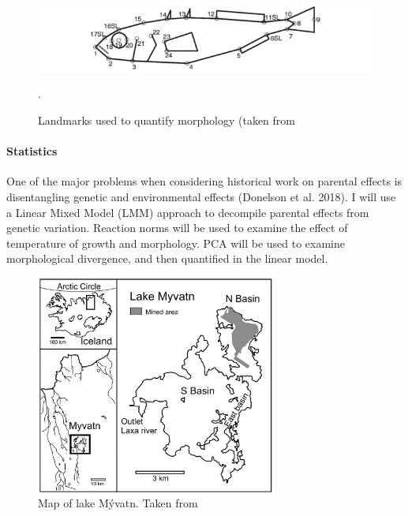\documentclass[12pt]{extarticle}
\begin{document}
\begin{figure}
 \centering
 \includegraphics[width = 1\textwidth]{landmarks}
 \caption{Landmarks used to quantify morphology (taken from \citet{Kristjansson2005}}
 \label{fig:landmark}.
\end{figure}


\paragraph{Statistics} One of the major problems when considering historical work on parental effects is disentangling genetic and environmental effects (Donelson et al. 2018). I will use a Linear Mixed Model (LMM) approach to decompile parental effects from genetic variation. Reaction norms will be used to examine the effect of temperature of growth and morphology. PCA will be used to examine morphological divergence, and then quantified in the linear model.

\begin{figure}
\centering
 \includegraphics[width=0.7\textwidth]{lake}
 \caption{Map of lake M\'yvatn. Taken from \citet{Einarsson2004}}
  \label{fig:map}
\end{figure}
\end{document}
